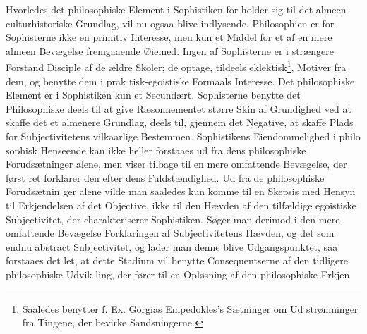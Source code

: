 \documentclass[12pt,a4paper]{book}
\begin{document}
Hvorledes det philosophiske Element i Sophistiken for\-%
holder sig til det almeen-culturhistoriske Grundlag, vil nu
ogsaa blive indlysende. Philosophien er for Sophisterne ikke
en primitiv Interesse, men kun et Middel for et af en mere
almeen Bevægelse fremgaaende Øiemed. Ingen af Sophisterne
er i strængere Forstand Disciple af de ældre Skoler; de optage,
tildeels eklektisk\footnote{Saaledes benytter f. Ex. Gorgias Empedokles's Sætninger om Ud\-%
strømninger fra Tingene, der bevirke Sandsningerne.}, Motiver fra dem, og benytte dem i prak\-%
tisk-egoistiske Formaals Interesse. Det philosophiske Element
er i Sophistiken kun et Secundært. Sophisterne benytte det
Philosophiske deels til at give Ræsonnementet større Skin af
Grundighed ved at skaffe det et almenere Grundlag, deels til,
gjennem det Negative, at skaffe Plads for Subjectivitetens
vilkaarlige Bestemmen. Sophistikens Eiendommelighed i philo\-%
sophisk Henseende kan ikke heller forstaaes ud fra dens
philosophiske Forudsætninger alene, men viser tilbage til en
mere omfattende Bevægelse, der først ret forklarer den efter
dens Fuldstændighed. Ud fra de philosophiske Forudsætnin\-%
ger alene vilde man saaledes kun komme til en Skepsis med
Hensyn til Erkjendelsen af det Objective, ikke til den Hævden
af den tilfældige egoistiske Subjectivitet, der charakteriserer
Sophistiken. Søger man derimod i den mere omfattende
Bevægelse Forklaringen af Subjectivitetens Hævden, og det
som endnu abstract Subjectivitet, og lader man denne blive
Udgangspunktet, saa forstaaes det let, at dette Stadium vil
benytte Consequentserne af den tidligere philosophiske Udvik\-%
ling, der fører til en Opløsning af den philosophiske Erkjen\-%
\end{document}
